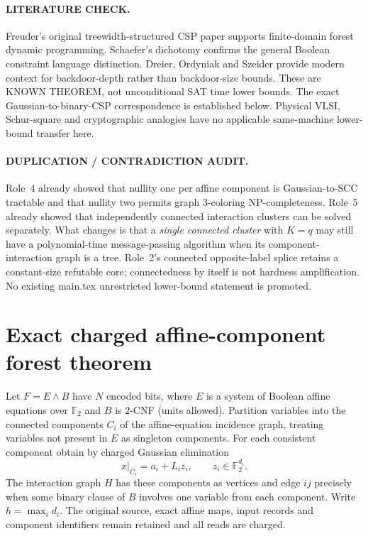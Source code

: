 \documentclass[11pt]{article}
\begin{document}
\paragraph{LITERATURE CHECK.}
Freuder's original treewidth-structured CSP paper \cite{freuder}
supports finite-domain forest dynamic programming. Schaefer's
dichotomy \cite{schaefer} confirms the general Boolean constraint
language distinction. Dreier, Ordyniak and Szeider \cite{dreier}
provide modern context for backdoor-depth rather than backdoor-size
bounds. These are KNOWN THEOREM, not unconditional SAT time lower bounds.
The exact Gaussian-to-binary-CSP correspondence is established below.
Physical VLSI, Schur-square and cryptographic analogies have no
applicable same-machine lower-bound transfer here.

\paragraph{DUPLICATION / CONTRADICTION AUDIT.}
Role~4 already showed that nullity one per affine component is
Gaussian-to-SCC tractable and that nullity two permits graph
3-coloring NP-completeness. Role~5 already showed that independently
connected interaction clusters can be solved separately. What
changes is that a \emph{single connected cluster} with $K=q$ may
still have a polynomial-time message-passing algorithm when
its component-interaction graph is a tree. Role~2's connected
opposite-label splice retains a constant-size refutable core;
connectedness by itself is not hardness amplification.
No existing main.tex unrestricted lower-bound statement is promoted.

\section{Exact charged affine-component forest theorem}
Let $F=E\wedge B$ have $N$ encoded bits, where $E$ is a system of
Boolean affine equations over $\mathbb F_2$ and $B$ is 2-CNF
(units allowed). Partition variables into the connected components
$C_i$ of the affine-equation incidence graph, treating variables
not present in $E$ as singleton components. For each consistent
component obtain by charged Gaussian elimination
\[
x|_{C_i}=a_i+L_i z_i,\qquad z_i\in\mathbb F_2^{d_i}.
\tag{1}
\]
The interaction graph $H$ has these components as vertices and
edge $ij$ precisely when some binary clause of $B$ involves one
variable from each component. Write $h=\max_i d_i$.
The original source, exact affine maps, input records and
component identifiers remain retained and all reads are charged.
\end{document}
